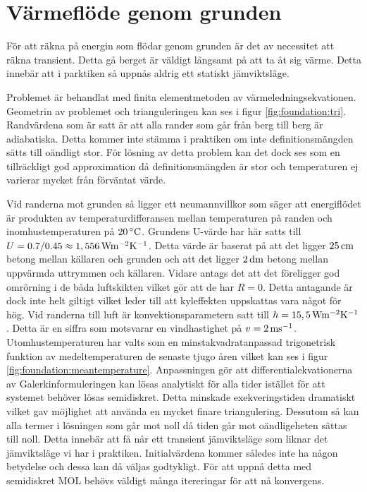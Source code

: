 \section{Värmeflöde genom grunden}

För att räkna på energin som flödar genom grunden är det av necessitet att räkna
transient. Detta gå berget är väldigt långsamt på att ta åt sig värme. Detta
innebär att i parktiken så uppnås aldrig ett statiskt jämviktsläge.

Problemet är behandlat med finita elementmetoden av värmeledningsekvationen.
Geometrin av problemet och trianguleringen kan ses i figur \ref{fig:foundation:tri}.
Randvärdena som är satt är att alla rander som går från berg till berg är adiabatiska.
Detta kommer inte stämma i praktiken om inte definitionsmängden sätts till oändligt
stor. För lösning av detta problem kan det dock ses som en tillräckligt god
approximation då definitionsmängden är stor och temperaturen ej varierar mycket
från förväntat värde.

Vid randerna mot grunden så ligger ett neumannvillkor som säger att energiflödet är produkten
av temperaturdifferansen mellan temperaturen på randen och inomhustemperaturen på $\unit[20]{^\circ C}$.
Grundens U-värde har här satts till $U = 0.7/0.45 \approx \unit[1,556]{ Wm^{-2}K^{-1}}$. Detta värde är
baserat på att det ligger $\unit[25]{cm}$ betong mellan källaren och grunden och att det ligger $\unit[2]{dm}$
betong mellan uppvärmda uttrymmen och källaren. Vidare antags det att det föreligger god omrörning i de båda
luftskikten vilket gör att de har $R=0$. Detta antagande är dock inte helt giltigt vilket leder till att kyleffekten
uppskattas vara något för hög.
Vid randerna till luft är konvektionsparametern satt
till $h = \unit[15,5]{Wm^{-2}K^{-1}}$. Detta är en siffra som motsvarar
en vindhastighet på $v = \unit[2]{ms^{-1}}$. Utomhustemperaturen har valts
som en minstakvadratanpassad trigonetrisk funktion av
medeltemperaturen de senaste tjugo åren vilket kan ses i figur
\ref{fig:foundation:meantemperature}. Anpassningen gör att
differentialekvationerna av Galerkinformuleringen kan lösas analytiskt
för alla tider istället för att systemet behöver lösas semidiskret.
Detta minskade exekveringstiden dramatiskt vilket gav möjlighet att använda en
mycket finare triangulering. Dessutom så kan alla termer i lösningen
som går mot noll då tiden går mot oändligeheten sättas till noll. Detta innebär
att få når ett transient jämviktsläge som liknar det jämviktsläge vi har i praktiken.
Initialvärdena kommer således inte ha någon betydelse och dessa kan då väljas
godtykligt. 
För att uppnå detta med semidiskret MOL behövs väldigt många itereringar för att
nå konvergens.

